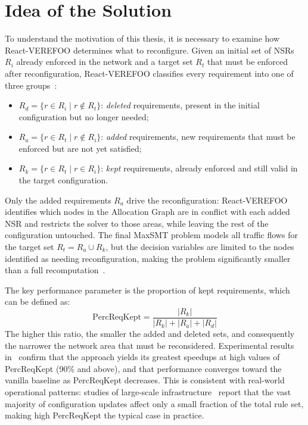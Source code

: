 
\section{Idea of the Solution}


To understand the motivation of this thesis, it is necessary to examine how React-VEREFOO determines what to reconfigure. Given an initial set of NSRs $R_i$ already enforced in the network and a target set $R_t$ that must be enforced after reconfiguration, React-VEREFOO classifies every requirement into one of three groups~\cite{reactverefoo}:

\begin{itemize}
  \item $R_d = \{r \in R_i \mid r \notin R_t\}$: \textit{deleted} requirements, present in the initial configuration but no longer needed;
  \item $R_a = \{r \in R_t \mid r \notin R_i\}$: \textit{added} requirements, new requirements that must be enforced but are not yet satisfied;
  \item $R_k = \{r \in R_t \mid r \in R_i\}$: \textit{kept} requirements, already enforced and still valid in the target configuration.
\end{itemize}

Only the added requirements $R_a$ drive the reconfiguration: React-VEREFOO identifies which nodes in the Allocation Graph are in conflict with each added NSR and restricts the solver to those areas, while leaving the rest of the configuration untouched. The final MaxSMT problem models all traffic flows for the target set $R_t = R_a \cup R_k$, but the decision variables are limited to the nodes identified as needing reconfiguration, making the problem significantly smaller than a full recomputation~\cite{reactverefoo}.

The key performance parameter is the proportion of kept requirements, which can be defined as:
\[
  \text{PercReqKept} = \frac{|R_k|}{|R_k| + |R_a| + |R_d|}
\]
The higher this ratio, the smaller the added and deleted sets, and consequently the narrower the network area that must be reconsidered. Experimental results in~\cite{reactverefoo} confirm that the approach yields its greatest speedups at high values of PercReqKept (90\% and above), and that performance converges toward the vanilla baseline as PercReqKept decreases. This is consistent with real-world operational patterns: studies of large-scale infrastructure~\cite{reactverefoo} report that the vast majority of configuration updates affect only a small fraction of the total rule set, making high PercReqKept the typical case in practice.

